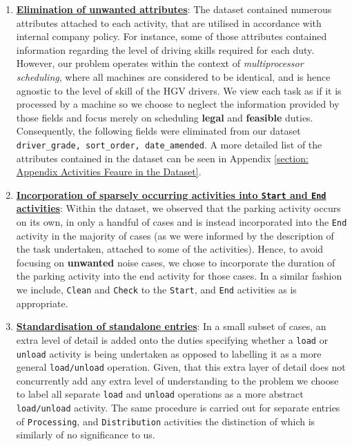 \vspace{\baselineskip}
\begin{enumerate}[label=\textbf{\arabic*}.]

\item \underline{\textbf{Elimination of unwanted attributes}}: The dataset contained numerous attributes attached to each activity, that are utilised in accordance with internal company policy. For instance, some of those attributes contained information regarding the level of driving skills required for each duty. However, our problem operates within the context of \textit{multiprocessor scheduling}, where all machines are considered to be identical, and is hence agnostic to the level of skill of the HGV drivers. We view each task as if it is processed by a machine so we choose to neglect the information provided by those fields and focus merely on scheduling \textbf{legal} and \textbf{feasible} duties. Consequently, the following fields were eliminated from our dataset \texttt{driver\_grade, sort\_order, date\_amended}. A more detailed list of the attributes contained in the dataset can be seen in Appendix \ref{section: Appendix Activities Feaure in the Dataset}.


\item \underline{\textbf{Incorporation of sparsely occurring activities into \texttt{Start} and \texttt{End} activities}}: Within the dataset, we observed that the parking activity occurs on its own, in only a handful of cases and is instead incorporated into the \texttt{End} activity in the majority of cases (as we were informed by the description of the task undertaken, attached to some of the activities). Hence, to avoid focusing on \textbf{unwanted} noise cases, we chose to incorporate the duration of the parking activity into the end activity for those cases. In a similar fashion we include, \texttt{Clean} and \texttt{Check} to the \texttt{Start}, and \texttt{End} activities as is appropriate.


\item \underline{\textbf{Standardisation of standalone entries}}: In a small subset of cases, an extra level of detail is added onto the duties specifying whether a \texttt{load} or \texttt{unload} activity is being undertaken as opposed to labelling it as a more general \texttt{load/unload} operation. Given, that this extra layer of detail does not concurrently add any extra level of understanding to the problem we choose to label all separate \texttt{load} and \texttt{unload} operations as a more abstract \texttt{load/unload} activity. The same procedure is carried out for separate entries of \texttt{Processing}, and \texttt{Distribution} activities the distinction of which is similarly of no significance to us.\par



\end{enumerate}
